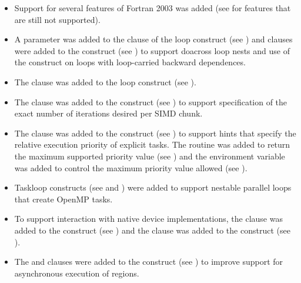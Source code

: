\begin{itemize}
\item Support for several features of Fortran 2003 was added (see 
       for features that are still 
      not supported).

\item A parameter was added to the  clause of the loop construct 
      (see ) and clauses were added to the 
       construct (see ) to 
      support doacross loop nests and use of the  construct on 
      loops with loop-carried backward dependences. 

\item The  clause was added to the loop construct 
      (see ).

\item The  clause was added to the  construct
      (see ) to support specification of 
      the exact number of iterations desired per SIMD chunk. 

\item The  clause was added to the  construct
      (see ) to support hints that specify
      the relative execution priority of explicit tasks. The 
       routine was added to return
      the maximum supported priority value (see 
      ) and the 
       environment variable was added to
      control the maximum priority value allowed (see 
      ).

\item Taskloop constructs (see  and 
      ) were added to support 
      nestable parallel loops that create OpenMP tasks. 

\item To support interaction with native device implementations, the 
       clause was added to the 
      construct (see ) and the 
       clause was added to the  construct
      (see ).

\item The  and  clauses were added to the 
       construct (see ) 
      to improve support for asynchronous execution of  regions. 


\end{itemize}
